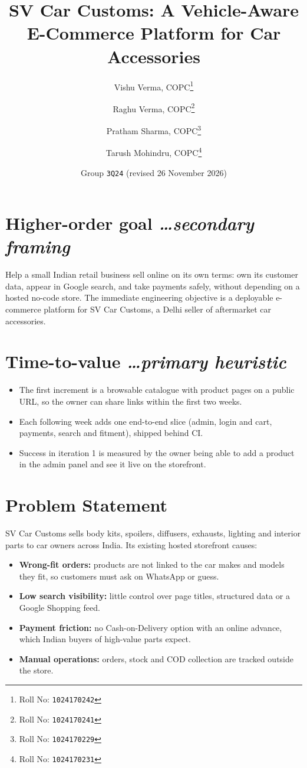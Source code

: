 \documentclass[11pt,a4paper]{article}
\title{SV Car Customs: A Vehicle-Aware E-Commerce Platform for Car Accessories}
\author{
  Vishu Verma, COPC\thanks{Roll No: \texttt{1024170242}}
  \and
  Raghu Verma, COPC\thanks{Roll No: \texttt{1024170241}}
  \and
  Pratham Sharma, COPC\thanks{Roll No: \texttt{1024170229}}
  \and
  Tarush Mohindru, COPC\thanks{Roll No: \texttt{1024170231}}
}
\date{Group \texttt{3Q24} \quad (revised 26 November 2026)}
\newcommand{\BvrHint}[1]{%
  {\normalfont\normalsize\itshape\hfill #1}}
\begin{document}
\maketitle

\section{Higher-order goal%
  \BvrHint{\ldots secondary framing}}
Help a small Indian retail business sell online on its own terms: own its
customer data, appear in Google search, and take payments safely, without
depending on a hosted no-code store. The immediate engineering objective is a
deployable e-commerce platform for SV Car Customs, a Delhi seller of
aftermarket car accessories.

\section{Time-to-value %
\BvrHint{\ldots primary heuristic}}
\begin{itemize}[leftmargin=0.7cm]
    \item The first increment is a browsable catalogue with product pages on a
          public URL, so the owner can share links within the first two weeks.
    \item Each following week adds one end-to-end slice (admin, login and cart,
          payments, search and fitment), shipped behind CI.
    \item Success in iteration 1 is measured by the owner being able to add a
          product in the admin panel and see it live on the storefront.
\end{itemize}

\section{Problem Statement}
SV Car Customs sells body kits, spoilers, diffusers, exhausts, lighting and
interior parts to car owners across India. Its existing hosted storefront
causes:
\begin{itemize}[leftmargin=0.7cm]
    \item \textbf{Wrong-fit orders:} products are not linked to the car makes
          and models they fit, so customers must ask on WhatsApp or guess.
    \item \textbf{Low search visibility:} little control over page titles,
          structured data or a Google Shopping feed.
    \item \textbf{Payment friction:} no Cash-on-Delivery option with an online
          advance, which Indian buyers of high-value parts expect.
    \item \textbf{Manual operations:} orders, stock and COD collection are
          tracked outside the store.
\end{itemize}
\end{document}
